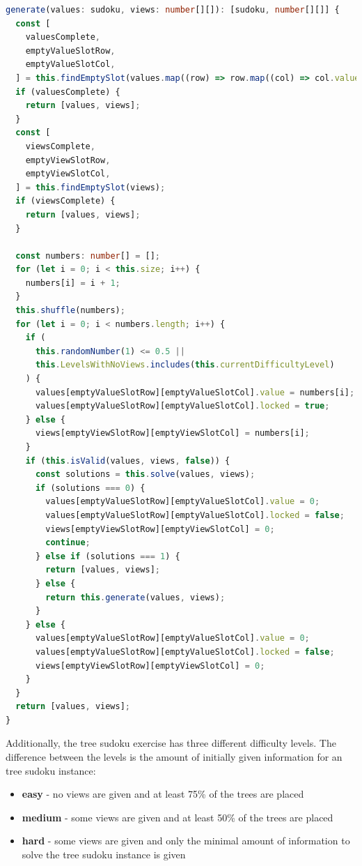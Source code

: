 \begin{lstlisting}[language=TypeScript,caption={Generation algorithm for a tree sudoku instance},label={lst:sudokuGenerator}]
generate(values: sudoku, views: number[][]): [sudoku, number[][]] {
  const [
    valuesComplete,
    emptyValueSlotRow,
    emptyValueSlotCol,
  ] = this.findEmptySlot(values.map((row) => row.map((col) => col.value)));
  if (valuesComplete) {
    return [values, views];
  }
  const [
    viewsComplete,
    emptyViewSlotRow,
    emptyViewSlotCol,
  ] = this.findEmptySlot(views);
  if (viewsComplete) {
    return [values, views];
  }

  const numbers: number[] = [];
  for (let i = 0; i < this.size; i++) {
    numbers[i] = i + 1;
  }
  this.shuffle(numbers);
  for (let i = 0; i < numbers.length; i++) {
    if (
      this.randomNumber(1) <= 0.5 ||
      this.LevelsWithNoViews.includes(this.currentDifficultyLevel)
    ) {
      values[emptyValueSlotRow][emptyValueSlotCol].value = numbers[i];
      values[emptyValueSlotRow][emptyValueSlotCol].locked = true;
    } else {
      views[emptyViewSlotRow][emptyViewSlotCol] = numbers[i];
    }
    if (this.isValid(values, views, false)) {
      const solutions = this.solve(values, views);
      if (solutions === 0) {
        values[emptyValueSlotRow][emptyValueSlotCol].value = 0;
        values[emptyValueSlotRow][emptyValueSlotCol].locked = false;
        views[emptyViewSlotRow][emptyViewSlotCol] = 0;
        continue;
      } else if (solutions === 1) {
        return [values, views];
      } else {
        return this.generate(values, views);
      }
    } else {
      values[emptyValueSlotRow][emptyValueSlotCol].value = 0;
      values[emptyValueSlotRow][emptyValueSlotCol].locked = false;
      views[emptyViewSlotRow][emptyViewSlotCol] = 0;
    }
  }
  return [values, views];
}
\end{lstlisting}

Additionally, the tree sudoku exercise has three different difficulty levels. The difference between the levels is the amount of initially given information for an tree sudoku instance:

\begin{itemize}
    \item \textbf{easy} - no views are given and at least 75\% of the trees are placed
    \item \textbf{medium} - some views are given and at least 50\% of the trees are placed
    \item \textbf{hard} - some views are given and only the minimal amount of information to solve the tree sudoku instance is given
\end{itemize}


